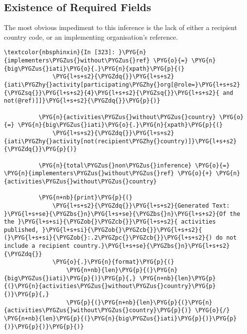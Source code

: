 \documentclass[letterpaper,10pt,english]{sphinxmanual}
\begin{document}
\subsection{Existence of Required Fields}
\label{\detokenize{Global Affairs Canada - Compliance Report:Existence-of-Required-Fields}}
The most obvious impediment to this inference is the lack of either a
recipient country code, or an implementing organisation's reference.

\begin{Verbatim}[commandchars=\\\{\}]
\textcolor{nbsphinxin}{In [323]: }\PYG{n}{implementers\PYGZus{}without\PYGZus{}ref} \PYG{o}{=} \PYG{n}{big\PYGZus{}iati}\PYG{o}{.}\PYG{n}{xpath}\PYG{p}{(}
              \PYG{l+s+s2}{\PYGZdq{}}\PYG{l+s+s2}{iati\PYGZhy{}activity[participating\PYGZhy{}org[@role=}\PYG{l+s+s2}{\PYGZsq{}}\PYG{l+s+s2}{4}\PYG{l+s+s2}{\PYGZsq{}}\PYG{l+s+s2}{ and not(@ref)]]}\PYG{l+s+s2}{\PYGZdq{}}\PYG{p}{)}
          
          \PYG{n}{activities\PYGZus{}without\PYGZus{}country} \PYG{o}{=} \PYG{n}{big\PYGZus{}iati}\PYG{o}{.}\PYG{n}{xpath}\PYG{p}{(}
              \PYG{l+s+s2}{\PYGZdq{}}\PYG{l+s+s2}{iati\PYGZhy{}activity[not(recipient\PYGZhy{}country)]}\PYG{l+s+s2}{\PYGZdq{}}\PYG{p}{)}
          
          \PYG{n}{total\PYGZus{}non\PYGZus{}inference} \PYG{o}{=} \PYG{n}{implementers\PYGZus{}without\PYGZus{}ref} \PYG{o}{+} \PYG{n}{activities\PYGZus{}without\PYGZus{}country}
          
          \PYG{n+nb}{print}\PYG{p}{(}
              \PYG{l+s+s2}{\PYGZdq{}}\PYG{l+s+s2}{Generated Text: }\PYG{l+s+se}{\PYGZbs{}n}\PYG{l+s+se}{\PYGZbs{}n}\PYG{l+s+s2}{Of the the }\PYG{l+s+si}{\PYGZob{}\PYGZcb{}}\PYG{l+s+s2}{ activities published, }\PYG{l+s+si}{\PYGZob{}\PYGZcb{}}\PYG{l+s+s2}{ (}\PYG{l+s+si}{\PYGZob{}:.2\PYGZpc{}\PYGZcb{}}\PYG{l+s+s2}{) do not include a recipient country.}\PYG{l+s+se}{\PYGZbs{}n}\PYG{l+s+s2}{\PYGZdq{}}
              \PYG{o}{.}\PYG{n}{format}\PYG{p}{(}
                  \PYG{n+nb}{len}\PYG{p}{(}\PYG{n}{big\PYGZus{}iati}\PYG{p}{)}\PYG{p}{,} \PYG{n+nb}{len}\PYG{p}{(}\PYG{n}{activities\PYGZus{}without\PYGZus{}country}\PYG{p}{)}\PYG{p}{,}
                  \PYG{p}{(}\PYG{n+nb}{len}\PYG{p}{(}\PYG{n}{activities\PYGZus{}without\PYGZus{}country}\PYG{p}{)} \PYG{o}{/} \PYG{n+nb}{len}\PYG{p}{(}\PYG{n}{big\PYGZus{}iati}\PYG{p}{)}\PYG{p}{)}\PYG{p}{)}\PYG{p}{)}
          

\end{Verbatim}
\end{document}
